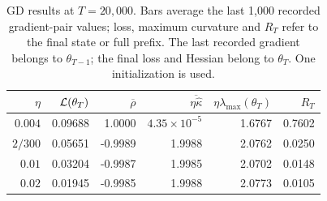 \begin{table}[htbp]
\centering
\small
\caption{GD results at $T=20{,}000$. Bars average the last 1,000 recorded
gradient-pair values; loss, maximum curvature and $R_T$ refer to the final
state or full prefix. The last recorded gradient belongs to $\theta_{T-1}$;
the final loss and Hessian belong to $\theta_T$. One initialization is used.}
\label{tab:gd-results}
\begin{tabular}{rrrrrr}
\toprule
$\eta$ & $\mathcal{L}(\theta_T)$ & $\overline\rho$ & $\overline{\eta\widehat\kappa}$ & $\eta\lambda_{\max}(\theta_T)$ & $R_T$\\
\midrule
$0.004$ & 0.09688 & 1.0000 & $4.35\times10^{-5}$ & 1.6767 & 0.7602\\
$2/300$ & 0.05651 & -0.9989 & 1.9988 & 2.0762 & 0.0250\\
$0.01$ & 0.03204 & -0.9987 & 1.9985 & 2.0702 & 0.0148\\
$0.02$ & 0.01945 & -0.9985 & 1.9988 & 2.0773 & 0.0105\\
\bottomrule
\end{tabular}
\end{table}
